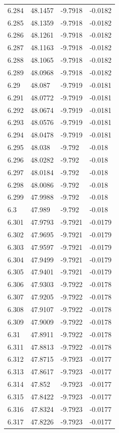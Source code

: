 \begin{tabular}{llll}
6.284 & 48.1457 & -9.7918 & -0.0182 \\
6.285 & 48.1359 & -9.7918 & -0.0182 \\
6.286 & 48.1261 & -9.7918 & -0.0182 \\
6.287 & 48.1163 & -9.7918 & -0.0182 \\
6.288 & 48.1065 & -9.7918 & -0.0182 \\
6.289 & 48.0968 & -9.7918 & -0.0182 \\
6.29 & 48.087 & -9.7919 & -0.0181 \\
6.291 & 48.0772 & -9.7919 & -0.0181 \\
6.292 & 48.0674 & -9.7919 & -0.0181 \\
6.293 & 48.0576 & -9.7919 & -0.0181 \\
6.294 & 48.0478 & -9.7919 & -0.0181 \\
6.295 & 48.038 & -9.792 & -0.018 \\
6.296 & 48.0282 & -9.792 & -0.018 \\
6.297 & 48.0184 & -9.792 & -0.018 \\
6.298 & 48.0086 & -9.792 & -0.018 \\
6.299 & 47.9988 & -9.792 & -0.018 \\
6.3 & 47.989 & -9.792 & -0.018 \\
6.301 & 47.9793 & -9.7921 & -0.0179 \\
6.302 & 47.9695 & -9.7921 & -0.0179 \\
6.303 & 47.9597 & -9.7921 & -0.0179 \\
6.304 & 47.9499 & -9.7921 & -0.0179 \\
6.305 & 47.9401 & -9.7921 & -0.0179 \\
6.306 & 47.9303 & -9.7922 & -0.0178 \\
6.307 & 47.9205 & -9.7922 & -0.0178 \\
6.308 & 47.9107 & -9.7922 & -0.0178 \\
6.309 & 47.9009 & -9.7922 & -0.0178 \\
6.31 & 47.8911 & -9.7922 & -0.0178 \\
6.311 & 47.8813 & -9.7922 & -0.0178 \\
6.312 & 47.8715 & -9.7923 & -0.0177 \\
6.313 & 47.8617 & -9.7923 & -0.0177 \\
6.314 & 47.852 & -9.7923 & -0.0177 \\
6.315 & 47.8422 & -9.7923 & -0.0177 \\
6.316 & 47.8324 & -9.7923 & -0.0177 \\
6.317 & 47.8226 & -9.7923 & -0.0177 \\

\end{tabular}
